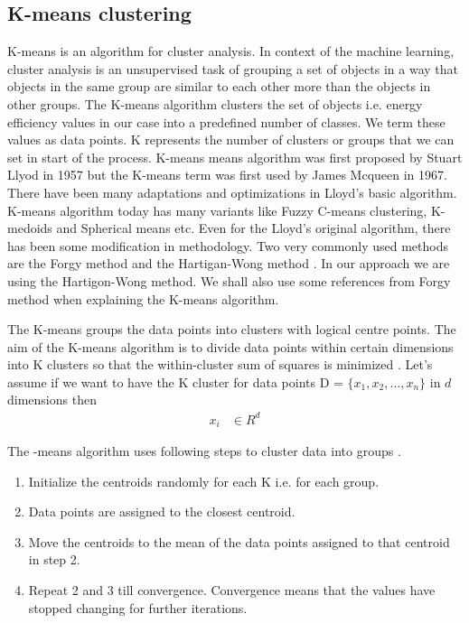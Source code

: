 \subsection{K-means clustering}
K-means is an algorithm for cluster analysis. In context of the machine learning, cluster analysis is an unsupervised task of grouping a set of objects in a way that objects in the same group are similar to each other more than the objects in other groups. The K-means algorithm clusters the set of objects i.e. energy efficiency values in our case into a predefined number of classes. We term these values as data points. K represents the number  of clusters or groups that we can set in start of the process. K-means means algorithm was first proposed by Stuart Llyod in 1957\cite{lloyd1982least} but the K-means term was first used by James Mcqueen in 1967\cite{macqueen1967some}. There have been many  adaptations and optimizations in Lloyd's basic algorithm. K-means algorithm today has many variants like Fuzzy C-means clustering, K-medoids and Spherical means etc. Even for the Lloyd's original algorithm, there has been some modification in methodology. Two very commonly used methods are the Forgy method \cite{forgy1965cluster} and the Hartigan-Wong method \cite{hartigan1979algorithm}. In our approach we are using the Hartigon-Wong method. We shall also use some references from Forgy method when explaining the K-means algorithm. 

The K-means groups the data points into clusters with logical centre points. The aim of the K-means algorithm is to divide data points within certain dimensions into K clusters so that the within-cluster sum of squares is minimized \cite{hartigan1979algorithm}. Let's assume if we want to have the K cluster for data points  D = \(\{x_1,x_2,\dotsc,x_n\}\) in \(d\) dimensions then
\begin{align*}
x_{i}& \in R ^{d}
\end{align*}
 
The -means algorithm uses following steps to cluster data into groups \cite{ng2000cs229}.
\begin{enumerate}
  \item Initialize the centroids randomly for each K i.e. for each group. 
  \item Data points are assigned to the closest centroid.
  \item Move the centroids to the mean of the data points assigned to that centroid in step 2.
  \item Repeat 2 and 3 till convergence. Convergence means that the values have stopped changing for further iterations.
\end{enumerate} 

